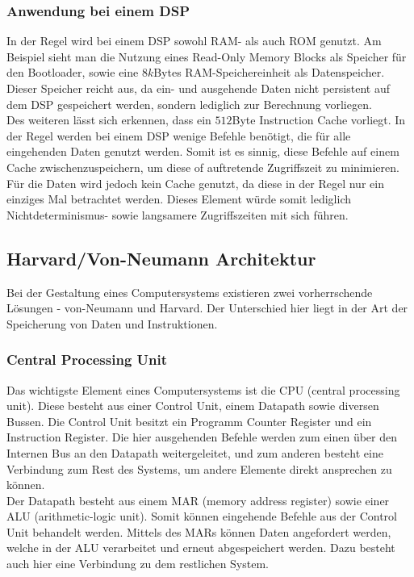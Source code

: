 \subsubsection{Anwendung bei einem DSP}
In der Regel wird bei einem DSP sowohl RAM- als auch ROM genutzt. Am Beispiel \cite{TI} sieht man die Nutzung eines Read-Only Memory Blocks als Speicher für den Bootloader, sowie eine $8k$Bytes RAM-Speichereinheit als Datenspeicher. Dieser Speicher reicht aus, da ein- und ausgehende Daten nicht persistent auf dem DSP gespeichert werden, sondern lediglich zur Berechnung vorliegen.\\
Des weiteren lässt sich erkennen, dass ein $512$Byte Instruction Cache vorliegt. In der Regel werden bei einem DSP wenige Befehle benötigt, die für alle eingehenden Daten genutzt werden. Somit ist es sinnig, diese Befehle auf einem Cache zwischenzuspeichern, um diese of auftretende Zugriffszeit zu minimieren.\\
Für die Daten wird jedoch kein Cache genutzt, da diese in der Regel nur ein einziges Mal betrachtet werden. Dieses Element würde somit lediglich Nichtdeterminismus- sowie langsamere Zugriffszeiten mit sich führen. 


\subsection{Harvard/Von-Neumann Architektur}\label{2.3}
Bei der Gestaltung eines Computersystems existieren zwei vorherrschende Lösungen - von-Neumann und Harvard. Der Unterschied hier liegt in der Art der Speicherung von Daten und Instruktionen.

\subsubsection{Central Processing Unit}
Das wichtigste Element eines Computersystems ist die CPU (central processing unit). Diese besteht aus einer Control Unit, einem Datapath sowie diversen Bussen. Die Control Unit besitzt ein Programm Counter Register und ein Instruction Register. Die hier ausgehenden Befehle werden zum einen über den Internen Bus an den Datapath weitergeleitet, und zum anderen besteht eine Verbindung zum Rest des Systems, um andere Elemente direkt ansprechen zu können.\\
Der Datapath besteht aus einem MAR (memory address register) sowie einer ALU (arithmetic-logic unit). Somit können eingehende Befehle aus der Control Unit behandelt werden. Mittels des MARs können Daten angefordert werden, welche in der ALU verarbeitet und erneut abgespeichert werden. Dazu besteht auch hier eine Verbindung zu dem restlichen System.\\

